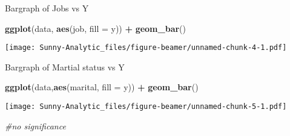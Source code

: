 \documentclass[ignorenonframetext,]{beamer}
\newenvironment{Shaded}{\begin{snugshade}}{\end{snugshade}}
\newcommand{\CommentTok}[1]{\textcolor[rgb]{0.56,0.35,0.01}{\textit{#1}}}
\newcommand{\DataTypeTok}[1]{\textcolor[rgb]{0.13,0.29,0.53}{#1}}
\newcommand{\KeywordTok}[1]{\textcolor[rgb]{0.13,0.29,0.53}{\textbf{#1}}}
\newcommand{\NormalTok}[1]{#1}
\newcommand{\OperatorTok}[1]{\textcolor[rgb]{0.81,0.36,0.00}{\textbf{#1}}}
\newcommand{\StringTok}[1]{\textcolor[rgb]{0.31,0.60,0.02}{#1}}
\begin{document}
\begin{frame}[fragile]{Bargraph of Jobs vs Y}
\protect\hypertarget{bargraph-of-jobs-vs-y}{}

\begin{Shaded}
\begin{Highlighting}[]
\KeywordTok{ggplot}\NormalTok{(data, }\KeywordTok{aes}\NormalTok{(job, }\DataTypeTok{fill =}\NormalTok{ y)) }\OperatorTok{+}\StringTok{ }\KeywordTok{geom_bar}\NormalTok{()}
\end{Highlighting}
\end{Shaded}

\texttt{[image: Sunny-Analytic\_files/figure-beamer/unnamed-chunk-4-1.pdf]}

\end{frame}

\begin{frame}[fragile]{Bargraph of Martial status vs Y}
\protect\hypertarget{bargraph-of-martial-status-vs-y}{}

\begin{Shaded}
\begin{Highlighting}[]
\KeywordTok{ggplot}\NormalTok{(data,}\KeywordTok{aes}\NormalTok{(marital, }\DataTypeTok{fill =}\NormalTok{ y)) }\OperatorTok{+}\StringTok{ }\KeywordTok{geom_bar}\NormalTok{()}
\end{Highlighting}
\end{Shaded}

\texttt{[image: Sunny-Analytic\_files/figure-beamer/unnamed-chunk-5-1.pdf]}

\begin{Shaded}
\begin{Highlighting}[]
\CommentTok{#no significance}
\end{Highlighting}
\end{Shaded}

\end{frame}
\end{document}
